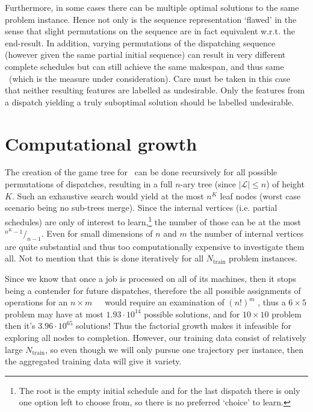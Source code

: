 Furthermore, in some cases there can be multiple optimal solutions to the same 
problem instance. 
Hence not only is the sequence representation `flawed' in the sense that slight 
permutations on the sequence are in fact equivalent w.r.t. the end-result.
In addition, varying permutations of the dispatching sequence (however given 
the same partial initial sequence) can result in very different complete 
schedules but can still achieve the same makespan, and thus same \fullnamerho\ 
(which is the measure under consideration). 
Care must be taken in this case that neither resulting features are labelled as 
undesirable. 
Only the features from a dispatch yielding a truly suboptimal solution should 
be labelled undesirable. 

\section{Computational growth}
The creation of the game tree for \JSP\ can be done recursively for all 
possible permutations of dispatches, resulting in a full \mbox{$n$-ary} tree 
(since $|\mathcal{L}|\leq n$) of height $K$. 
Such an exhaustive search would yield at the most $n^K$ leaf nodes (worst case 
scenario being no sub-trees merge). Since the internal vertices (i.e. 
partial schedules) are only of interest to learn,\footnote{The root is 
  the empty initial schedule and for the last dispatch there is only one option 
  left to choose from, so there is no preferred `choice' to learn.} 
the number of those can be at the most \mbox{${}^{n^K-1}/_{n-1}$}.
Even for small dimensions of $n$ and $m$ the number of internal vertices are 
quite substantial and thus too computationally expensive to investigate them 
all. Not to mention that this is done iteratively for all $N_{\text{train}}$ 
problem instances.

Since we know that once a job is processed on all of its machines, then it 
stops being a contender for future dispatches, therefore the all possible 
assignments of operations for an $n\times m$~~\JSP\ would require an 
examination of $(n!)^m$ \citep{Giffler60}, thus a $6\times5$ problem may have 
at most $1.93\cdot10^{14}$ possible solutions, and for $10\times10$ problem 
then it's $3.96\cdot10^{65}$ solutions! Thus the factorial growth makes it 
infeasible for exploring all nodes to completion. However, our training data 
consist of relatively large $N_{\text{train}}$, so even though we will only 
pursue one trajectory per instance, then the aggregated training data will give 
it variety.

